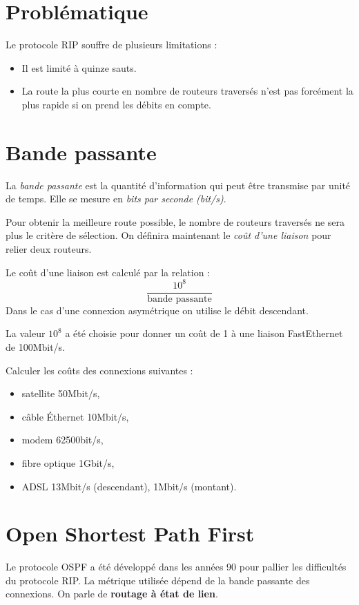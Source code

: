 \documentclass[a4paper,11pt]{article}
\begin{document}
\section{Problématique}
Le protocole RIP souffre de plusieurs limitations :
\begin{itemize}
    \item Il est limité à quinze sauts.
    \item La route la plus courte en nombre de routeurs traversés n'est pas forcément la plus rapide si on prend les débits en compte.
\end{itemize}
\begin{center}
\end{center}
\section{Bande passante}
\begin{aretenir}[]
La \emph{bande passante} est la quantité d'information qui peut être transmise par unité de temps. Elle se mesure en \emph{bits par seconde (bit/s)}.
\end{aretenir}
Pour obtenir la meilleure route possible, le nombre de routeurs traversés ne sera plus le critère de sélection. On définira maintenant le \emph{coût d'une liaison} pour relier deux routeurs.
\begin{aretenir}[]
Le coût d'une liaison est calculé par la relation :
$$\dfrac{10^8}{\mbox{bande passante}}$$
Dans le cas d'une connexion asymétrique on utilise le débit descendant.
\end{aretenir}
La valeur $10^8$ a été choisie pour donner un coût de 1 à une liaison FastEthernet de 100Mbit/s.
\begin{activite}
Calculer les coûts des connexions suivantes :
\begin{itemize}
    \item satellite 50Mbit/s,
    \item câble Éthernet 10Mbit/s,
    \item modem 62500bit/s,
    \item fibre optique 1Gbit/s,
    \item ADSL 13Mbit/s (descendant), 1Mbit/s (montant).
\end{itemize}
\end{activite}
\section{Open Shortest Path First}
Le protocole OSPF a été développé dans les années 90 pour pallier les difficultés du protocole RIP. La métrique utilisée dépend de la bande passante des connexions. On parle de \textbf{routage à état de lien}.
\end{document}
